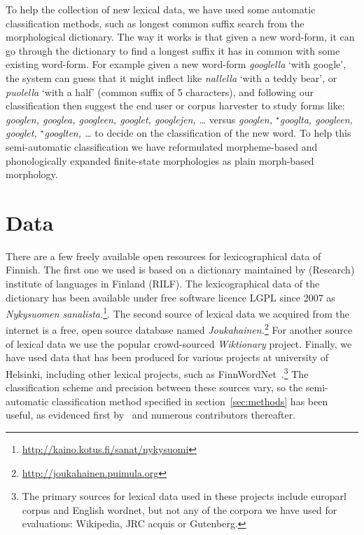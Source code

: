 \documentclass[a4paper,12pt]{article}
\begin{document}
To help the collection of new lexical data, we have used some automatic
classification methods, such as longest common suffix search from the
morphological dictionary.  The way it works is that given a new word-form, it
can go through the dictionary to find a longest suffix it has in common with
some existing word-form. For example  given a new word-form \emph{googlella}
`with google', the system can guess that it might inflect like \emph{nallella}
`with a teddy bear', or \emph{puolella} `with a half' (common suffix of 5
characters), and following our classification then suggest the end user or
corpus harvester to study forms like: \emph{googlen, googlea, googleen,
googlet, googlejen, \ldots} versus \emph{googlen, ${}^\star$googlta, googleen,
googlet, ${}^\star$googlten, \ldots} to decide on the classification of the new
word. To help this semi-automatic classification we have reformulated
morpheme-based and phonologically expanded finite-state morphologies as plain
morph-based morphology.

\section{Data}
\label{sec:data}

There are a few freely available open resources for lexicographical data of
Finnish. The first one  we used is based on a dictionary maintained by
(Research) institute of languages in Finland (RILF). The lexicographical data
of the dictionary has been available under free software licence LGPL since
2007 as \emph{Nykysuomen
sanalista.}\footnote{\url{http://kaino.kotus.fi/sanat/nykysuomi}}.  The second
source of lexical data we acquired from the internet is a free, open source
database named
\emph{Joukahainen.}\footnote{\url{http://joukahainen.puimula.org}}  For another
source of lexical data we use the popular crowd-sourced \emph{Wiktionary}
project.  Finally, we have used data that has been produced for various
projects at university of Helsinki, including other lexical projects, such as
FinnWordNet~\citep{linden2010finnwordnet}.\footnote{The primary sources for
lexical data used in these projects include europarl corpus and English
wordnet, but not any of the corpora we have used for evaluations: Wikipedia,
JRC acquis or Gutenberg.} The classification scheme and precision between these
sources vary, so the semi-automatic classification method specified in
section~\ref{sec:methods} has been useful, as evidenced first
by~\citet{listenmaa2009combining} and numerous contributors thereafter.
\end{document}
